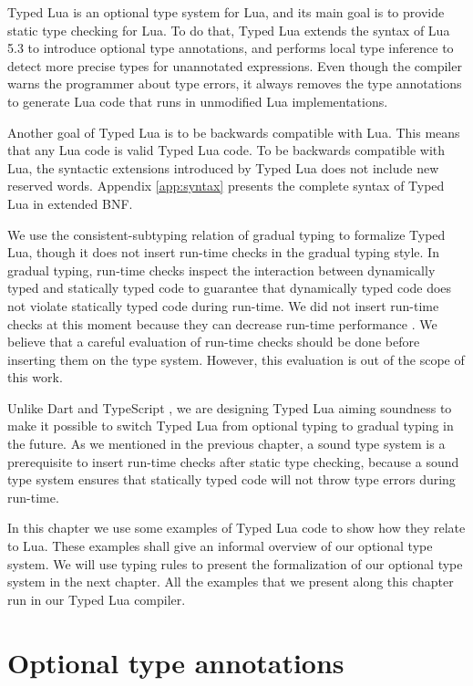 Typed Lua is an optional type system for Lua, and its main goal is to
provide static type checking for Lua.
To do that, Typed Lua extends the syntax of Lua 5.3 to introduce
optional type annotations, and performs local type inference \citep{pierce2000lti}
to detect more precise types for unannotated expressions.
Even though the compiler warns the programmer about type errors,
it always removes the type annotations to generate Lua code that
runs in unmodified Lua implementations.

Another goal of Typed Lua is to be backwards compatible with Lua.
This means that any Lua code is valid Typed Lua code.
To be backwards compatible with Lua, the syntactic extensions introduced
by Typed Lua does not include new reserved words.
Appendix \ref{app:syntax} presents the complete syntax of Typed Lua
in extended BNF.

We use the consistent-subtyping relation of gradual typing
\citep{siek2007objects,siek2013mutable} to formalize Typed Lua,
though it does not insert run-time checks in the gradual typing style.
In gradual typing, run-time checks inspect the interaction between
dynamically typed and statically typed code to guarantee that dynamically
typed code does not violate statically typed code during run-time.
We did not insert run-time checks at this moment because they can decrease
run-time performance \citep{allende2013cis}.
We believe that a careful evaluation of run-time checks should be done before
inserting them on the type system.
However, this evaluation is out of the scope of this work.

Unlike Dart \citep{dart} and TypeScript \citep{typescript},
we are designing Typed Lua aiming soundness to make it possible to
switch Typed Lua from optional typing to gradual typing in the future.
As we mentioned in the previous chapter,
a sound type system is a prerequisite to insert run-time checks after
static type checking, because a sound type system ensures that
statically typed code will not throw type errors during run-time.

In this chapter we use some examples of Typed Lua code to show how
they relate to Lua.
These examples shall give an informal overview of our optional type system.
We will use typing rules to present the formalization of our optional type
system in the next chapter.
All the examples that we present along this chapter run in our Typed Lua compiler.

\section{Optional type annotations}
\label{sec:annotations}

